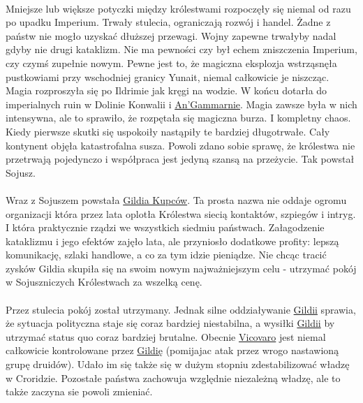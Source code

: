 \documentclass[10pt,twoside,twocolumn]{book}
\begin{document}
\paragraph{}
Mniejsze lub większe potyczki między królestwami rozpoczęły się niemal od razu po upadku Imperium.
Trwały stulecia, ograniczają rozwój i handel.
Żadne z państw nie mogło uzyskać dłuższej przewagi.
Wojny zapewne trwałyby nadal gdyby nie drugi kataklizm.
Nie ma pewności czy był echem zniszczenia Imperium, czy czymś zupełnie nowym.
Pewne jest to, że magiczna eksplozja wstrząsnęła pustkowiami przy wschodniej granicy Yunait, niemal całkowicie je niszcząc. 
Magia rozproszyła się po Ildrimie jak kręgi na wodzie.
W końcu dotarła do imperialnych ruin w Dolinie Konwalii i \hyperref[AnGammarna]{An’Gammarnie}.
Magia zawsze była w nich intensywna, ale to sprawiło, że rozpętała się magiczna burza.
I kompletny chaos.
Kiedy pierwsze skutki się uspokoiły nastąpiły te bardziej długotrwałe.
Cały kontynent objęła katastrofalna susza.
Powoli zdano sobie sprawę, że królestwa nie przetrwają pojedynczo i współpraca jest jedyną szansą na przeżycie.
Tak powstał Sojusz.

\paragraph{}
Wraz z Sojuszem powstała \hyperref[GildiaKupcow]{Gildia Kupców}.
Ta prosta nazwa nie oddaje ogromu organizacji która przez lata oplotła Królestwa siecią kontaktów, szpiegów i intryg.
I która praktycznie rządzi we wszystkich siedmiu państwach.
Załagodzenie kataklizmu i jego efektów zajęło lata, ale przyniosło dodatkowe profity: lepszą komunikację, szlaki handlowe, a co za tym idzie pieniądze.
Nie chcąc tracić zysków Gildia skupiła się na swoim nowym najważniejszym celu - utrzymać pokój w Sojuszniczych Królestwach za wszelką cenę.

\paragraph{}
Przez stulecia pokój został utrzymany.
Jednak silne oddziaływanie \hyperref[GildiaKupcow]{Gildii} sprawia, że sytuacja polityczna staje się coraz bardziej niestabilna, a wysiłki \hyperref[GildiaKupcow]{Gildii} by utrzymać status quo coraz bardziej brutalne.
Obecnie \hyperref[Vicovaro]{Vicovaro} jest niemal całkowicie kontrolowane przez \hyperref[GildiaKupcow]{Gildię} (pomijajac atak przez wrogo nastawioną grupę druidów).
Udało im się także się w dużym stopniu zdestabilizować władzę w Croridzie.
Pozostałe państwa zachowuja względnie niezależną władzę, ale to także zaczyna sie powoli zmieniać.
\end{document}
